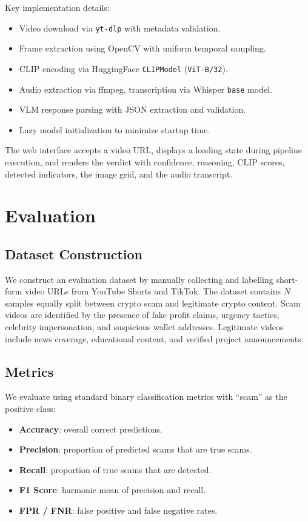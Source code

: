 \documentclass[12pt,a4paper]{article}
\begin{document}
Key implementation details:
\begin{itemize}[nosep]
  \item Video download via \texttt{yt-dlp} with metadata validation.
  \item Frame extraction using OpenCV with uniform temporal sampling.
  \item CLIP encoding via HuggingFace \texttt{CLIPModel} (\texttt{ViT-B/32}).
  \item Audio extraction via ffmpeg, transcription via Whisper \texttt{base} model.
  \item VLM response parsing with JSON extraction and validation.
  \item Lazy model initialization to minimize startup time.
\end{itemize}

The web interface accepts a video URL, displays a loading state during
pipeline execution, and renders the verdict with confidence, reasoning,
CLIP scores, detected indicators, the image grid, and the audio transcript.

\section{Evaluation}

\subsection{Dataset Construction}

We construct an evaluation dataset by manually collecting and labelling
short-form video URLs from YouTube Shorts and TikTok. The dataset
contains $N$ samples equally split between crypto scam and legitimate
crypto content. Scam videos are identified by the presence of fake profit
claims, urgency tactics, celebrity impersonation, and suspicious wallet
addresses. Legitimate videos include news coverage, educational content,
and verified project announcements.

\subsection{Metrics}

We evaluate using standard binary classification metrics with ``scam''
as the positive class:
\begin{itemize}[nosep]
  \item \textbf{Accuracy}: overall correct predictions.
  \item \textbf{Precision}: proportion of predicted scams that are true scams.
  \item \textbf{Recall}: proportion of true scams that are detected.
  \item \textbf{F1 Score}: harmonic mean of precision and recall.
  \item \textbf{FPR / FNR}: false positive and false negative rates.
\end{itemize}
\end{document}
